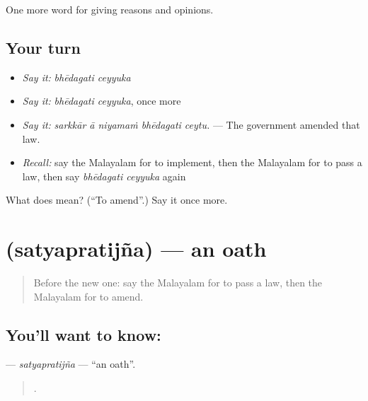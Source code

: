 \begin{grammarlens}[title={What you've built}]
One more word for giving reasons and opinions.
\end{grammarlens}

\subsection*{Your turn}
\begin{itemize}
\raggedright
  \item \emph{Say it:} \emph{bhēdagati ceyyuka}
  \item \emph{Say it:} \emph{bhēdagati ceyyuka}, once more
  \item \emph{Say it:} \emph{sarkkār ā niyamaṁ bhēdagati ceytu.} — The government amended that law.
  \item \emph{Recall:} say the Malayalam for to implement, then the Malayalam for to pass a law, then say \emph{bhēdagati ceyyuka} again
\end{itemize}

\begin{tcolorbox}[breakable,colback=teal!4,colframe=teal!35!black,title={Before you move on}]
What does   mean? (\textquotedblleft{}To amend\textquotedblright{}.) Say it once more.
\end{tcolorbox}
\section[\texorpdfstring{\ml{സത്യപ്രതിജ്ഞ} (satyapratijña)}{സത്യപ്രതിജ്ഞ (satyapratijña)}]{ (satyapratijña) — an oath}

\label{lesson:ML-C423-satyapratijna}



\begin{quote}
Before the new one: say the Malayalam for to pass a law, then the Malayalam for to amend.
\end{quote}

\subsection*{You'll want to know: }
\textbf{} — \emph{satyapratijña} — \textquotedblleft{}an oath\textquotedblright{}.

\begin{quote}
    .
\end{quote}

